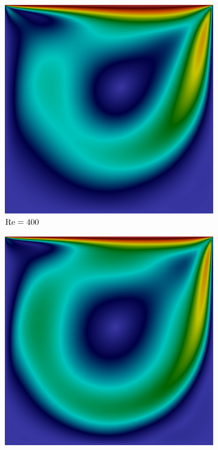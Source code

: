 \begin{figure}[h!]
\begin{subfigure}{0.32\textwidth}
        \includegraphics[width=\linewidth]{Figuras/Cavity/Re400.png}
        \caption{$\mathrm{Re}=400$}
    \end{subfigure}
    \begin{subfigure}{0.32\textwidth}
        \includegraphics[width=\linewidth]{Figuras/Cavity/Re1000.png}

\end{subfigure}
\end{figure}
